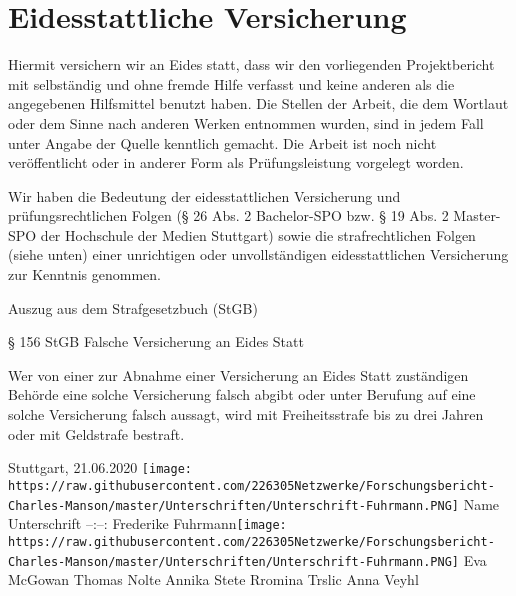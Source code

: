 \documentclass[
]{article}
\begin{document}
\hypertarget{eidesstattliche-versicherung}{%
\section{Eidesstattliche
Versicherung}\label{eidesstattliche-versicherung}}

Hiermit versichern wir an Eides statt, dass wir den vorliegenden
Projektbericht mit selbständig und ohne fremde Hilfe verfasst und keine
anderen als die angegebenen Hilfsmittel benutzt haben. Die Stellen der
Arbeit, die dem Wortlaut oder dem Sinne nach anderen Werken entnommen
wurden, sind in jedem Fall unter Angabe der Quelle kenntlich gemacht.
Die Arbeit ist noch nicht veröffentlicht oder in anderer Form als
Prüfungsleistung vorgelegt worden.

Wir haben die Bedeutung der eidesstattlichen Versicherung und
prüfungsrechtlichen Folgen (§ 26 Abs. 2 Bachelor-SPO bzw. § 19 Abs. 2
Master-SPO der Hochschule der Medien Stuttgart) sowie die
strafrechtlichen Folgen (siehe unten) einer unrichtigen oder
unvollständigen eidesstattlichen Versicherung zur Kenntnis genommen.

Auszug aus dem Strafgesetzbuch (StGB)

§ 156 StGB Falsche Versicherung an Eides Statt

Wer von einer zur Abnahme einer Versicherung an Eides Statt zuständigen
Behörde eine solche Versicherung falsch abgibt oder unter Berufung auf
eine solche Versicherung falsch aussagt, wird mit Freiheitsstrafe bis zu
drei Jahren oder mit Geldstrafe bestraft.

Stuttgart, 21.06.2020
\texttt{[image: https://raw.githubusercontent.com/226305Netzwerke/Forschungsbericht-Charles-Manson/master/Unterschriften/Unterschrift-Fuhrmann.PNG]}
\textbar{} Name\textbar{} Unterschrift\textbar{}
\textbar--:\textbar--:\textbar{} \textbar{} Frederike
Fuhrmann\textbar{}\texttt{[image: https://raw.githubusercontent.com/226305Netzwerke/Forschungsbericht-Charles-Manson/master/Unterschriften/Unterschrift-Fuhrmann.PNG]}
\textbar{} \textbar{} Eva McGowan\textbar{} \textbar{} \textbar{} Thomas
Nolte\textbar{} \textbar{} \textbar{} Annika Stete\textbar{} \textbar{}
\textbar{} Rromina Trslic\textbar{} \textbar{} \textbar{} Anna
Veyhl\textbar{} \textbar{}
\end{document}
